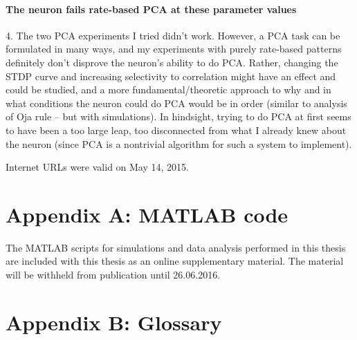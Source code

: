 \documentclass[a4paper,12pt]{report}
\theoremstyle{definition}
\begin{document}
\subsubsection{The neuron fails rate-based PCA at these parameter values}
4. The two PCA experiments I tried didn't work. However, a PCA task can be formulated in many ways, and my experiments with purely rate-based patterns definitely don't disprove the neuron's ability to do PCA. Rather, changing the STDP curve and increasing selectivity to correlation might have an effect and could be studied, and a more fundamental/theoretic approach to why and in what conditions the neuron could do PCA would be in order (similar to analysis of Oja rule -- but with simulations). In hindsight, trying to do PCA at first seems to have been a too large leap, too disconnected from what I already knew about the neuron (since PCA is a nontrivial algorithm for such a system to implement).







Internet URLs were valid on May 14, 2015.
\newpage






\chapter*{Appendix A: MATLAB code}
\label{appendix:code}

The MATLAB scripts for simulations and data analysis performed in this thesis are included with this thesis as an online supplementary material. The material will be withheld from publication until 26.06.2016.







\chapter*{Appendix B: Glossary}
\label{appendix:glossary}
\end{document}

